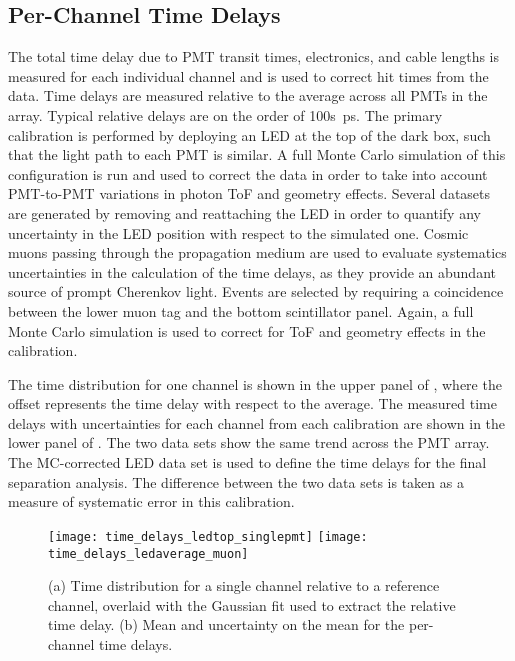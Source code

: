 \subsection{Per-Channel Time Delays}\label{s:delay}

The total time delay due to PMT transit times, electronics, and cable lengths is measured for each individual channel and is used to correct hit times from the data. 
Time delays are measured relative to the average across all PMTs in the array. 
Typical relative delays are on the order of 100s~ps. 
The primary calibration is performed by deploying an LED at the top of the dark box, such that the light path to each PMT is similar.  A full Monte Carlo simulation of this configuration is run and used to correct the data in order to take into account PMT-to-PMT variations in photon ToF and geometry effects.  
Several datasets are generated by removing and reattaching the LED in order to quantify any uncertainty in the LED position with respect to the simulated one. 
Cosmic muons passing through the propagation medium are used to evaluate systematics uncertainties in the calculation of the time delays, as they provide an abundant source of prompt Cherenkov light. 
Events are selected  by requiring a coincidence between the lower muon tag and the bottom scintillator panel. 
Again, a full Monte Carlo simulation is used to correct for ToF and geometry effects in the calibration.  

The time distribution for one channel is shown in the upper panel of , where the offset represents the time delay with respect to the average. 
The measured time delays with uncertainties for each channel from each calibration are shown in the lower panel of .  
The two data sets show the same trend across the PMT array.  
The MC-corrected LED data set is used to define the time delays for the final separation analysis.
The difference between the two data sets is taken as a measure of  systematic error in this calibration.  

\begin{figure}
	\centering
	\texttt{[image: time\_delays\_ledtop\_singlepmt]}
	\texttt{[image: time\_delays\_ledaverage\_muon]}
	\caption{(a) Time distribution for a single channel relative to a reference channel, overlaid with the Gaussian fit used to extract the relative time delay.  (b) Mean and uncertainty on the mean for the per-channel time delays.}
	\label{fig:time_delay}
\end{figure}


